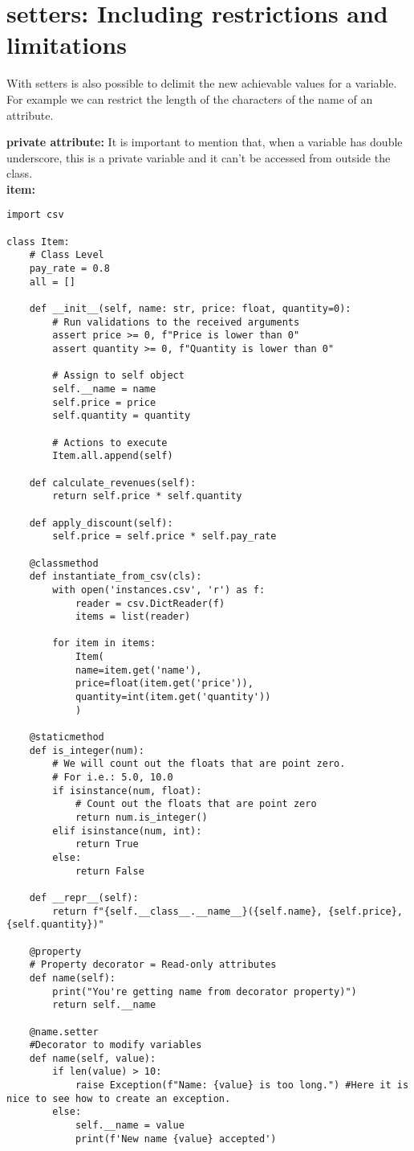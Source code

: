 \documentclass{article}
\begin{document}
\section{setters: Including restrictions and limitations}

With setters is also possible to delimit the new achievable values for a variable.
For example we can restrict the length of the characters of the name of an attribute.

\textbf{private attribute:} It is important to mention that, when a variable has double underscore, this is a private variable and it can't be accessed from outside the class.\\


\textbf{item:}
\begin{lstlisting}
import csv

class Item:
	# Class Level
	pay_rate = 0.8
	all = []
	
	def __init__(self, name: str, price: float, quantity=0):
		# Run validations to the received arguments
		assert price >= 0, f"Price is lower than 0"
		assert quantity >= 0, f"Quantity is lower than 0"
		
		# Assign to self object
		self.__name = name
		self.price = price
		self.quantity = quantity
		
		# Actions to execute
		Item.all.append(self)
		
	def calculate_revenues(self):
		return self.price * self.quantity
		
	def apply_discount(self):
		self.price = self.price * self.pay_rate
		
	@classmethod
	def instantiate_from_csv(cls):
		with open('instances.csv', 'r') as f:
			reader = csv.DictReader(f)
			items = list(reader)
			
		for item in items:
			Item(
			name=item.get('name'),
			price=float(item.get('price')),
			quantity=int(item.get('quantity'))
			)
		
	@staticmethod
	def is_integer(num):
		# We will count out the floats that are point zero.
		# For i.e.: 5.0, 10.0
		if isinstance(num, float):
			# Count out the floats that are point zero
			return num.is_integer()
		elif isinstance(num, int):
			return True
		else:
			return False
	
	def __repr__(self):
		return f"{self.__class__.__name__}({self.name}, {self.price}, {self.quantity})"
	
	@property
	# Property decorator = Read-only attributes
	def name(self):
		print("You're getting name from decorator property)")
		return self.__name
		
	@name.setter
	#Decorator to modify variables
	def name(self, value):
		if len(value) > 10:
			raise Exception(f"Name: {value} is too long.") #Here it is nice to see how to create an exception.
		else:
			self.__name = value
			print(f'New name {value} accepted')
\end{lstlisting}
\end{document}
